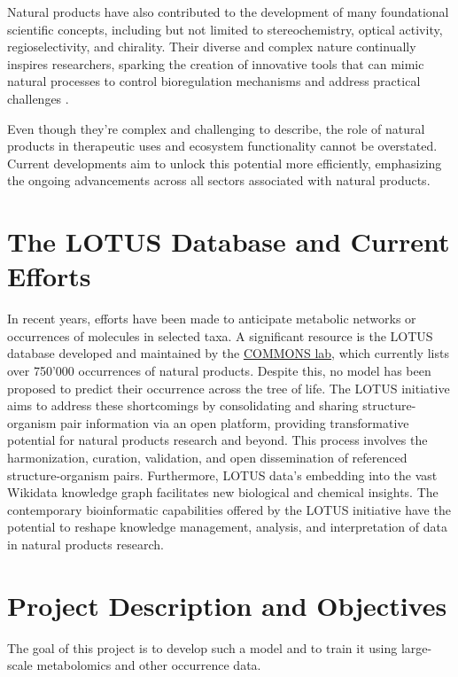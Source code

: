 \documentclass[
11pt, %
oneside, %
english, %
singlespacing, %
headsepline, %
chapterinoneline, %
]{MastersDoctoralThesis} %
\begin{document}
Natural products have also contributed to the development of many foundational scientific concepts, including but not limited to stereochemistry, optical activity, regioselectivity, and chirality. Their diverse and complex nature continually inspires researchers, sparking the creation of innovative tools that can mimic natural processes to control bioregulation mechanisms and address practical challenges \cite{drasarGrowingImportanceNatural2019}.

Even though they're complex and challenging to describe, the role of natural products in therapeutic uses and ecosystem functionality cannot be overstated. Current developments aim to unlock this potential more efficiently, emphasizing the ongoing advancements across all sectors associated with natural products.

\section{The LOTUS Database and Current Efforts}
In recent years, efforts have been made to anticipate metabolic networks or occurrences of molecules in selected taxa. A significant resource is the LOTUS database \cite{rutzLOTUSInitiativeOpen2022} developed and maintained by the \href{https://www.unifr.ch/bio/en/groups/allard/}{COMMONS lab}, which currently lists over 750'000 occurrences of natural products. Despite this, no model has been proposed to predict their occurrence across the tree of life. The LOTUS initiative aims to address these shortcomings by consolidating and sharing structure-organism pair information via an open platform, providing transformative potential for natural products research and beyond. This process involves the harmonization, curation, validation, and open dissemination of referenced structure-organism pairs. Furthermore, LOTUS data's embedding into the vast Wikidata knowledge graph facilitates new biological and chemical insights. The contemporary bioinformatic capabilities offered by the LOTUS initiative have the potential to reshape knowledge management, analysis, and interpretation of data in natural products research.

\section{Project Description and Objectives}
The goal of this project is to develop such a model and to train it using large-scale metabolomics and other occurrence data.

\end{document}
